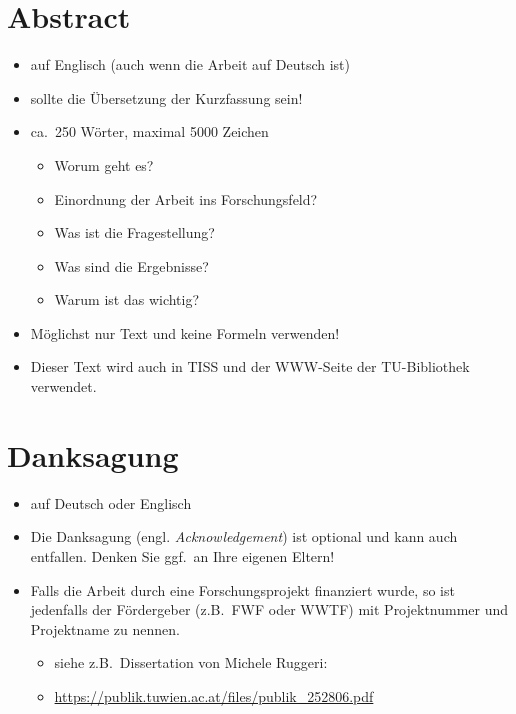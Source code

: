 \chapter*{Abstract}
\thispagestyle{empty}

{

\begin{itemize}
\item auf Englisch (auch wenn die Arbeit auf Deutsch ist)
\item sollte die Übersetzung der Kurzfassung sein!
\item ca.\ 250 Wörter, maximal 5000 Zeichen
\begin{itemize}
\item Worum geht es?
\item Einordnung der Arbeit ins Forschungsfeld?
\item Was ist die Fragestellung?
\item Was sind die Ergebnisse?
\item Warum ist das wichtig?
\end{itemize}
\item Möglichst nur Text und keine Formeln verwenden!
\item Dieser Text wird auch in TISS und der WWW-Seite der TU-Bibliothek verwendet.
\end{itemize}

}

\cleardoublepage


\chapter*{Danksagung} %
\thispagestyle{empty}

\begin{itemize}
\item auf Deutsch oder Englisch
\item Die Danksagung (engl. {\em Acknowledgement}) ist optional und kann auch entfallen. Denken Sie ggf.\ an Ihre eigenen Eltern!

\item Falls die Arbeit durch eine Forschungsprojekt finanziert wurde, so ist jedenfalls der Fördergeber (z.B.\ FWF oder WWTF) mit Projektnummer und Projektname zu nennen.
\begin{itemize}
\item siehe z.B.\ Dissertation von Michele Ruggeri:
\item[] \href{https://publik.tuwien.ac.at/files/publik_252806.pdf}{\ttfamily https://publik.tuwien.ac.at/files/publik\_252806.pdf}
\end{itemize}

\end{itemize}

